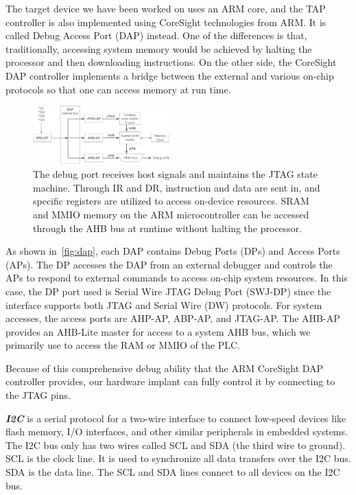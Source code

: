 The target device we have been worked on uses an ARM core, and the TAP controller is also implemented using CoreSight technologies from ARM. It is called Debug Access Port (DAP) instead. One of the differences is that, traditionally, accessing system memory would be achieved by halting the processor and then downloading instructions. On the other side, the CoreSight DAP controller implements a bridge between the external and various on-chip protocols so that one can access memory at run time. 

\begin{figure}[ht]
	\includegraphics[width=0.47\textwidth]{figures/dap}
	\centering
	\caption{The debug port receives host signals and maintains the JTAG state machine. Through IR and DR, instruction and data are sent in, and specific registers are utilized to access on-device resources. SRAM and MMIO memory on the ARM microcontroller can be accessed through the AHB bus at runtime without halting the processor.}
	\label{fig:dap}
\end{figure}

As shown in~\autoref{fig:dap}, each DAP contains Debug Ports (DPs) and Access Ports (APs). The DP  accesses the DAP from an external debugger and controls the APs to respond to external commands to access on-chip system resources. In this case, the DP port used is Serial Wire JTAG Debug Port (SWJ-DP) since the interface supports both JTAG and Serial Wire (DW) protocols.
For system accesses, the access ports are AHP-AP, ABP-AP, and JTAG-AP. The AHB-AP provides an AHB-Lite master for access to a system AHB bus, which we primarily use to access the RAM or MMIO of the PLC. 


Because of this comprehensive debug ability that the ARM CoreSight DAP controller provides, our hardware implant can fully control it by connecting to the JTAG pins.


\textbf{\textit{I2C}} is a serial protocol for a two-wire interface to connect low-speed devices like flash memory, I/O interfaces, and other similar peripherals in embedded systems. The I2C bus only has two wires called SCL and SDA (the third wire to ground). SCL is the clock line. It is used to synchronize all data transfers over the I2C bus. SDA is the data line. The SCL and SDA lines connect to all devices on the I2C bus.


